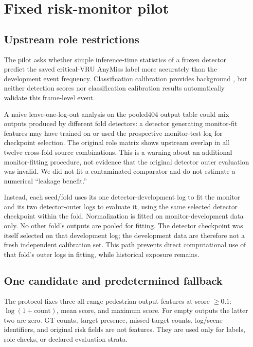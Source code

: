 \documentclass[conference]{IEEEtran}
\begin{document}
\section{Fixed risk-monitor pilot}
\subsection{Upstream role restrictions}
The pilot asks whether simple inference-time statistics of a frozen detector predict the saved critical-VRU AnyMiss label more accurately than the development event frequency. Classification calibration provides background \cite{Guo2017Calibration}, but neither detection scores nor classification calibration results automatically validate this frame-level event.

A naive leave-one-log-out analysis on the pooled404 output table could mix outputs produced by different fold detectors: a detector generating monitor-fit features may have trained on or used the prospective monitor-test log for checkpoint selection. The original role matrix shows upstream overlap in all twelve cross-fold source combinations. This is a warning about an additional monitor-fitting procedure, not evidence that the original detector outer evaluation was invalid. We did not fit a contaminated comparator and do not estimate a numerical ``leakage benefit.''

Instead, each seed/fold uses its one detector-development log to fit the monitor and its two detector-outer logs to evaluate it, using the same selected detector checkpoint within the fold. Normalization is fitted on monitor-development data only. No other fold's outputs are pooled for fitting. The detector checkpoint was itself selected on that development log; the development data are therefore not a fresh independent calibration set. This path prevents direct computational use of that fold's outer logs in fitting, while historical exposure remains.

\subsection{One candidate and predetermined fallback}
The protocol fixes three all-range pedestrian-output features at score $\geq0.1$: $\log(1+\text{count})$, mean score, and maximum score. For empty outputs the latter two are zero. GT counts, target presence, missed-target counts, log/scene identifiers, and original risk fields are not features. They are used only for labels, role checks, or declared evaluation strata.
\end{document}
